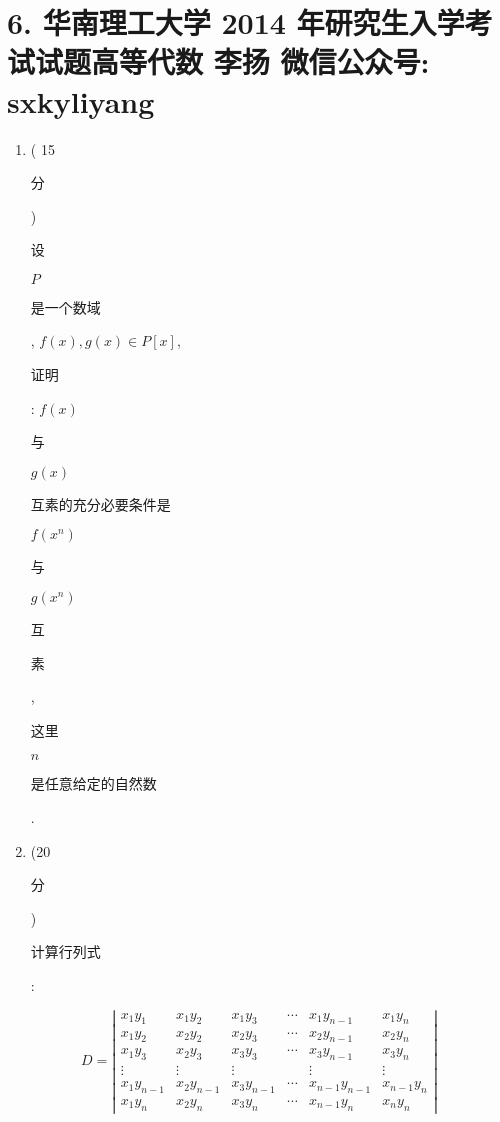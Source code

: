 \documentclass[10pt]{article}
\begin{document}
\section{6. 华南理工大学 2014 年研究生入学考试试题高等代数 
 李扬 
 微信公众号: sxkyliyang}
\begin{enumerate}
  \item ( 15 \begin{CJK}{UTF8}{mj}分\end{CJK}) \begin{CJK}{UTF8}{mj}设\end{CJK} $P$ \begin{CJK}{UTF8}{mj}是一个数域\end{CJK}, $f(x), g(x) \in P[x]$, \begin{CJK}{UTF8}{mj}证明\end{CJK}: $f(x)$ \begin{CJK}{UTF8}{mj}与\end{CJK} $g(x)$ \begin{CJK}{UTF8}{mj}互素的充分必要条件是\end{CJK} $f\left(x^{n}\right)$ \begin{CJK}{UTF8}{mj}与\end{CJK} $g\left(x^{n}\right)$ \begin{CJK}{UTF8}{mj}互\end{CJK} \begin{CJK}{UTF8}{mj}素\end{CJK}, \begin{CJK}{UTF8}{mj}这里\end{CJK} $n$ \begin{CJK}{UTF8}{mj}是任意给定的自然数\end{CJK}.

  \item (20 \begin{CJK}{UTF8}{mj}分\end{CJK}) \begin{CJK}{UTF8}{mj}计算行列式\end{CJK}:

\end{enumerate}
$$
D=\left|\begin{array}{cccccc}
x_{1} y_{1} & x_{1} y_{2} & x_{1} y_{3} & \cdots & x_{1} y_{n-1} & x_{1} y_{n} \\
x_{1} y_{2} & x_{2} y_{2} & x_{2} y_{3} & \cdots & x_{2} y_{n-1} & x_{2} y_{n} \\
x_{1} y_{3} & x_{2} y_{3} & x_{3} y_{3} & \cdots & x_{3} y_{n-1} & x_{3} y_{n} \\
\vdots & \vdots & \vdots & & \vdots & \vdots \\
x_{1} y_{n-1} & x_{2} y_{n-1} & x_{3} y_{n-1} & \cdots & x_{n-1} y_{n-1} & x_{n-1} y_{n} \\
x_{1} y_{n} & x_{2} y_{n} & x_{3} y_{n} & \cdots & x_{n-1} y_{n} & x_{n} y_{n}
\end{array}\right|
$$
\end{document}
